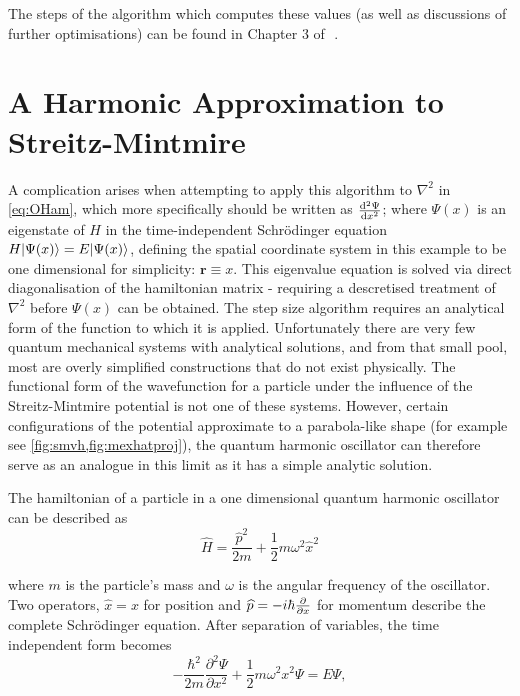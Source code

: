 The steps of the algorithm which computes these values (as well as discussions of further optimisations) can be found in Chapter 3 of~\,.

\section[A Harmonic Approximation to Streitz-Mintmire][Streitz-Mintmire Harmonic Approximation]{A Harmonic Approximation to Streitz-Mintmire}\label{sec:harmsm}

A complication arises when attempting to apply this algorithm to $\nabla^2$ in \cref{eq:OHam}, which more specifically should be written as $\cramped{\frac{\mathrm{d}^2\Psi}{\mathrm{d}x^2}}$; where $\Psi(x)$ is an eigenstate of $H$ in the time-independent Schr\"odinger equation $H\lvert\Psi(x)\rangle = E\lvert\Psi(x)\rangle$, defining the spatial coordinate system in this example to be one dimensional for simplicity: $\mathbf{r} \equiv x$.
This eigenvalue equation is solved via direct diagonalisation of the hamiltonian matrix - requiring a descretised treatment of $\nabla^2$ before $\Psi(x)$ can be obtained.
The step size algorithm requires an analytical form of the function to which it is applied.
Unfortunately there are very few quantum mechanical systems with analytical solutions, and from that small pool, most are overly simplified constructions that do not exist physically.
The functional form of the wavefunction for a particle under the influence of the Streitz-Mintmire potential is not one of these systems.
However, certain configurations of the potential approximate to a parabola-like shape (for example see \cref{fig:smvh,fig:mexhatproj}), the quantum harmonic oscillator can therefore serve as an analogue in this limit as it has a simple analytic solution.

The hamiltonian of a particle in a one dimensional quantum harmonic oscillator can be described as
\begin{equation}
\widehat{H} = \frac{\widehat{p}^2}{2m}+\frac{1}{2}m\omega^2\widehat{x}^2\label{eq:hamho}
\end{equation}

where $m$ is the particle's mass and $ω$ is the angular frequency of the oscillator.
Two operators, $\widehat{x} = x$ for position and $\cramped{\widehat{p} = -i\hbar \frac{\partial}{\partial x}}$ for momentum describe the complete Schr\"{o}dinger equation.
After separation of variables, the time independent form becomes
\begin{equation}
-\frac{\hbar^2}{2m}\frac{\partial^2 \Psi}{\partial x^2}+\frac{1}{2}m\omega^2x^2 \Psi = E\Psi,
\label{eq:hamti}
\end{equation}

